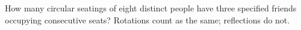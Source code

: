 How many circular seatings of eight distinct people have three specified friends occupying consecutive seats? Rotations count as the same; reflections do not.
